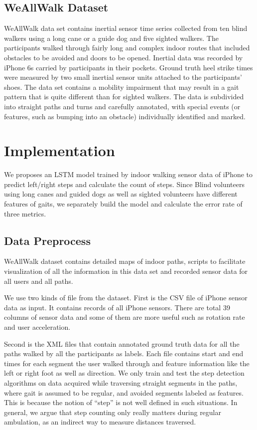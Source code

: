 \documentclass[11pt]{article}
\begin{document}
\subsection{WeAllWalk Dataset}
WeAllWalk data set contains inertial sensor time series collected from ten blind walkers using a long cane or a guide dog and five sighted walkers. The participants walked through fairly long and complex indoor routes that included obstacles to be avoided and doors to be opened. Inertial data was recorded by iPhone 6s carried by participants in their pockets. Ground truth heel strike times were measured by two small inertial sensor units attached to the participants’ shoes. The data set contains a mobility impairment that may result in a gait pattern that is quite different than for sighted walkers. The data is subdivided into straight paths and turns and carefully annotated, with special events (or features, such as bumping into an obstacle) individually identified and marked.

\section{Implementation}
We proposes an LSTM model trained by indoor walking sensor data of iPhone to predict left/right steps and calculate the count of steps. Since Blind volunteers using long canes and guided dogs as well as sighted volunteers have different features of gaits, we separately build the model and calculate the error rate of three metrics.

\subsection{Data Preprocess}
WeAllWalk dataset contains detailed maps of indoor paths, scripts to facilitate visualization of all the information in this data set and recorded sensor data for all users and all paths.

We use two kinds of file from the dataset. First is the CSV file of iPhone sensor data as input. It contains records of all iPhone sensors. There are total 39 columns of sensor data and some of them are more useful such as rotation rate and user acceleration.

Second is the XML files that contain annotated ground truth data for all the paths walked by all the participants as labels. Each file contains start and end times for each segment the user walked through and feature information like the left or right foot as well as direction. We only train and test the step detection algorithms on data acquired while traversing straight segments in the paths, where gait is assumed to be regular, and avoided segments labeled as features. This is because the notion of “step” is not well defined in such situations. In general, we argue that step counting only really matters during regular ambulation, as an indirect way to measure distances traversed.
\end{document}
